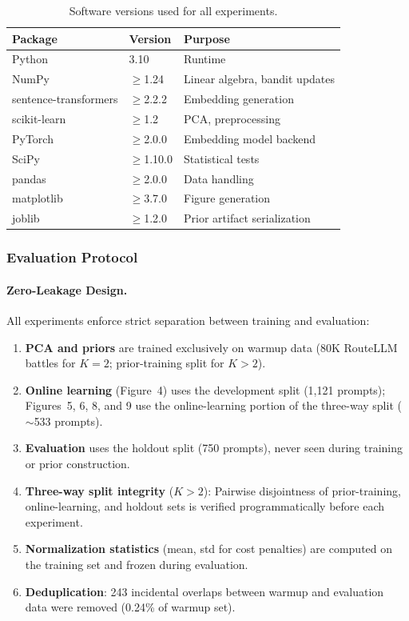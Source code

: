 \begin{table}[h]
\centering
\caption{Software versions used for all experiments.}
\label{tab:software}
\small
\begin{tabular}{@{}lll@{}}
\toprule
\textbf{Package} & \textbf{Version} & \textbf{Purpose} \\
\midrule
Python & 3.10 & Runtime \\
NumPy & $\geq$1.24 & Linear algebra, bandit updates \\
sentence-transformers & $\geq$2.2.2 & Embedding generation \\
scikit-learn & $\geq$1.2 & PCA, preprocessing \\
PyTorch & $\geq$2.0.0 & Embedding model backend \\
SciPy & $\geq$1.10.0 & Statistical tests \\
pandas & $\geq$2.0.0 & Data handling \\
matplotlib & $\geq$3.7.0 & Figure generation \\
joblib & $\geq$1.2.0 & Prior artifact serialization \\
\bottomrule
\end{tabular}
\end{table}

\subsubsection{Evaluation Protocol}

\paragraph{Zero-Leakage Design.}
All experiments enforce strict separation between training and evaluation:
\begin{enumerate}[leftmargin=*,noitemsep]
    \item \textbf{PCA and priors} are trained exclusively on warmup data (80K RouteLLM battles for $K{=}2$; prior-training split for $K{>}2$).
    \item \textbf{Online learning} (Figure~4) uses the development split (1,121 prompts); Figures~5, 6, 8, and 9 use the online-learning portion of the three-way split (${\sim}$533 prompts).
    \item \textbf{Evaluation} uses the holdout split (750 prompts), never seen during training or prior construction.
    \item \textbf{Three-way split integrity} ($K{>}2$): Pairwise disjointness of prior-training, online-learning, and holdout sets is verified programmatically before each experiment.
    \item \textbf{Normalization statistics} (mean, std for cost penalties) are computed on the training set and frozen during evaluation.
    \item \textbf{Deduplication}: 243 incidental overlaps between warmup and evaluation data were removed (0.24\% of warmup set).
\end{enumerate}

